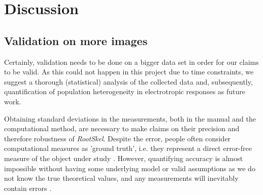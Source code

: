 
\chapter{Discussion} %

\label{discussion} %

%





\section{Validation on more images}\label{sec:validation}



Certainly, validation needs to be done on a bigger data set in order for our claims to be valid.
As this could not happen in this project due to time constraints, we suggest a thorough (statistical) analysis of the collected data and, subsequently, quantification of population heterogeneity in electrotropic responses as future work.

Obtaining standard deviations in the measurements, both in the manual and the computational method, are necessary to make claims on their precision and therefore robustness of \textit{RootSkel}. Despite the error, people often consider computational measures as 'ground truth', i.e. they represent a direct error-free measure of the object under study \cite{pound2017autoroot}. However, quantifying accuracy is almost impossible without having some underlying model or valid assumptions as we do not know the true theoretical values, and any measurements will inevitably contain errors %
\cite{dee2015image}.


